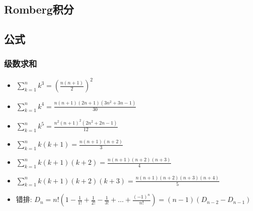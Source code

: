 \documentclass[landscape, twocolumn, 8pt, a4paper, twoside]{extarticle}
\begin{document}
  \subsection{Romberg积分}
    
  
  \subsection{公式}
    \subsubsection{级数求和}
    \begin{itemize}
    \item
      $\sum_{k=1}^{n}k^3 = (\frac{n(n+1)}{2})^2  $
    \item
      $\sum_{k=1}^{n}k^4 = \frac{n(n+1)(2n+1)(3n^2+3n-1)}{30}  $
    \item
      $\sum_{k=1}^{n}k^5 = \frac{n^2(n+1)^2(2n^2+2n-1)}{12}  $
    \item
      $\sum_{k=1}^{n}k(k+1) = \frac{n(n+1)(n+2)}{3}  $
    \item
      $\sum_{k=1}^{n}k(k+1)(k+2) = \frac{n(n+1)(n+2)(n+3)}{4} $
    \item
      $\sum_{k=1}^{n}k(k+1)(k+2)(k+3) = \frac{n(n+1)(n+2)(n+3)(n+4)}{5} $
    \item
      $\mbox{错排: }D_n = n!(1-\frac{1}{1!}+\frac{1}{2!}-\frac{1}{3!}+\ldots+\frac{(-1)^n}{n!}) = (n-1)(D_{n-2}-D_{n-1})$
    \end{itemize}
\end{document}
